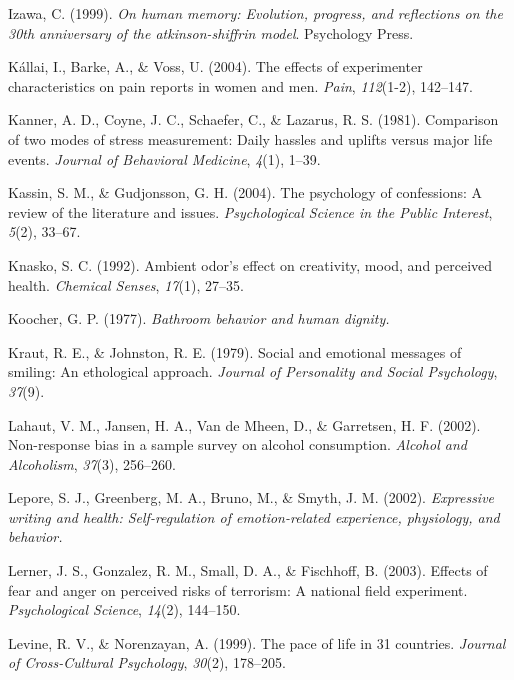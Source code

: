 \documentclass[
]{krantz}
\newlength{\cslhangindent}
\newenvironment{CSLReferences}[2] %
 {\begin{list}{}{%
  \setlength{\itemindent}{0pt}
  \setlength{\leftmargin}{0pt}
  \setlength{\parsep}{0pt}
  \ifodd #1
   \setlength{\leftmargin}{\cslhangindent}
   \setlength{\itemindent}{-1\cslhangindent}
  \fi
  \setlength{\itemsep}{#2\baselineskip}}}
 {\end{list}}
\begin{document}
\begin{CSLReferences}{1}{0}
Izawa, C. (1999). \emph{On human memory: Evolution, progress, and reflections on the 30th anniversary of the atkinson-shiffrin model}. Psychology Press.

Kállai, I., Barke, A., \& Voss, U. (2004). The effects of experimenter characteristics on pain reports in women and men. \emph{Pain}, \emph{112}(1-2), 142--147.

Kanner, A. D., Coyne, J. C., Schaefer, C., \& Lazarus, R. S. (1981). Comparison of two modes of stress measurement: Daily hassles and uplifts versus major life events. \emph{Journal of Behavioral Medicine}, \emph{4}(1), 1--39.

Kassin, S. M., \& Gudjonsson, G. H. (2004). The psychology of confessions: A review of the literature and issues. \emph{Psychological Science in the Public Interest}, \emph{5}(2), 33--67.

Knasko, S. C. (1992). Ambient odor's effect on creativity, mood, and perceived health. \emph{Chemical Senses}, \emph{17}(1), 27--35.

Koocher, G. P. (1977). \emph{Bathroom behavior and human dignity.}

Kraut, R. E., \& Johnston, R. E. (1979). Social and emotional messages of smiling: An ethological approach. \emph{Journal of Personality and Social Psychology}, \emph{37}(9).

Lahaut, V. M., Jansen, H. A., Van de Mheen, D., \& Garretsen, H. F. (2002). Non-response bias in a sample survey on alcohol consumption. \emph{Alcohol and Alcoholism}, \emph{37}(3), 256--260.

Lepore, S. J., Greenberg, M. A., Bruno, M., \& Smyth, J. M. (2002). \emph{Expressive writing and health: Self-regulation of emotion-related experience, physiology, and behavior.}

Lerner, J. S., Gonzalez, R. M., Small, D. A., \& Fischhoff, B. (2003). Effects of fear and anger on perceived risks of terrorism: A national field experiment. \emph{Psychological Science}, \emph{14}(2), 144--150.

Levine, R. V., \& Norenzayan, A. (1999). The pace of life in 31 countries. \emph{Journal of Cross-Cultural Psychology}, \emph{30}(2), 178--205.


\end{CSLReferences}
\end{document}
